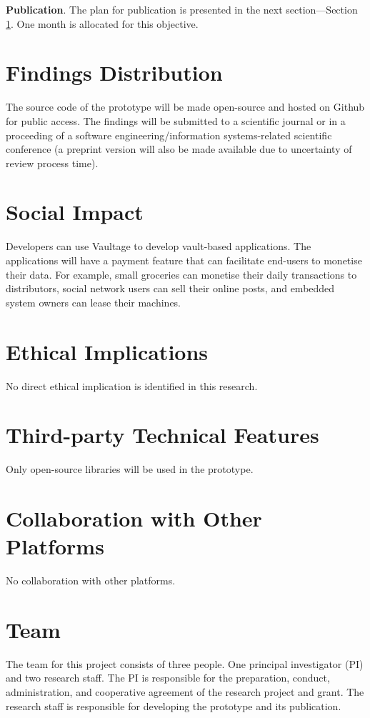 \documentclass[]{article}
\begin{document}
	\textbf{Publication}. The plan for publication is presented in the next section---Section \ref{sec:findings_distribution}. One month is allocated for this objective.   
	
	\section{Findings Distribution}
	\label{sec:findings_distribution}
	The source code of the prototype will be made open-source and hosted on Github for public access. The findings will be submitted to a scientific journal or in a proceeding of a software engineering/information systems-related scientific conference (a preprint version will also be made available due to uncertainty of review process time).   
	
	\section{Social Impact}
	Developers can use Vaultage to develop vault-based applications. The applications will have a payment feature that can facilitate end-users to monetise their data. For example, small groceries can monetise their daily transactions to distributors, social network users can sell their online posts, and embedded system owners can lease their machines.     
	
	\section{Ethical Implications}
	No direct ethical implication is identified in this research.
	
	\section{Third-party Technical Features}
	Only open-source libraries will be used in the prototype.  
	
	\section{Collaboration with Other Platforms}
	No collaboration with other platforms.
	
	\section{Team}
	The team for this project consists of three people. One principal investigator (PI) and two research staff. The PI is responsible for the preparation, conduct, administration, and cooperative agreement of the research project and grant. The research staff is responsible for developing the prototype and its publication. 
	
\end{document}
